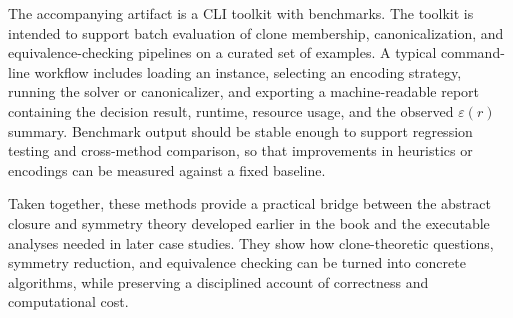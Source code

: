 \documentclass[11pt]{article}
\begin{document}
The accompanying artifact is a CLI toolkit with benchmarks. The toolkit is intended to support batch evaluation of clone membership, canonicalization, and equivalence-checking pipelines on a curated set of examples. A typical command-line workflow includes loading an instance, selecting an encoding strategy, running the solver or canonicalizer, and exporting a machine-readable report containing the decision result, runtime, resource usage, and the observed \(\varepsilon(r)\) summary. Benchmark output should be stable enough to support regression testing and cross-method comparison, so that improvements in heuristics or encodings can be measured against a fixed baseline.

Taken together, these methods provide a practical bridge between the abstract closure and symmetry theory developed earlier in the book and the executable analyses needed in later case studies. They show how clone-theoretic questions, symmetry reduction, and equivalence checking can be turned into concrete algorithms, while preserving a disciplined account of correctness and computational cost.
\end{document}
